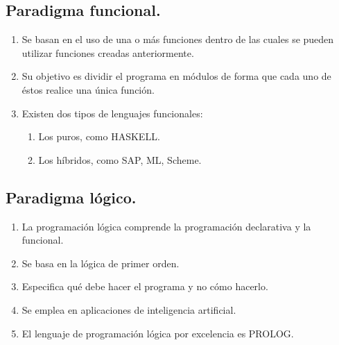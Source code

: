\documentclass{article}
\begin{document}
\subsection*{Paradigma funcional.}
\begin{enumerate}
	\item Se basan en el uso de una o más funciones dentro de las cuales se pueden utilizar funciones creadas anteriormente.
	\item Su objetivo es dividir el programa en módulos de forma que cada uno de éstos realice una única función.
	\item Existen dos tipos de lenguajes funcionales:
	\begin{enumerate}
		\item Los puros, como HASKELL.
		\item Los híbridos, como SAP, ML, Scheme.
	\end{enumerate}
\end{enumerate}
\subsection*{Paradigma lógico.}
\begin{enumerate}
	\item La programación lógica comprende la programación declarativa y la funcional.
	\item Se basa en la lógica de primer orden.
	\item Especifica qué debe hacer el programa y no cómo hacerlo.
	\item Se emplea en aplicaciones de inteligencia artificial.
	\item  El lenguaje de programación lógica por excelencia es PROLOG.
\end{enumerate}
\end{document}

